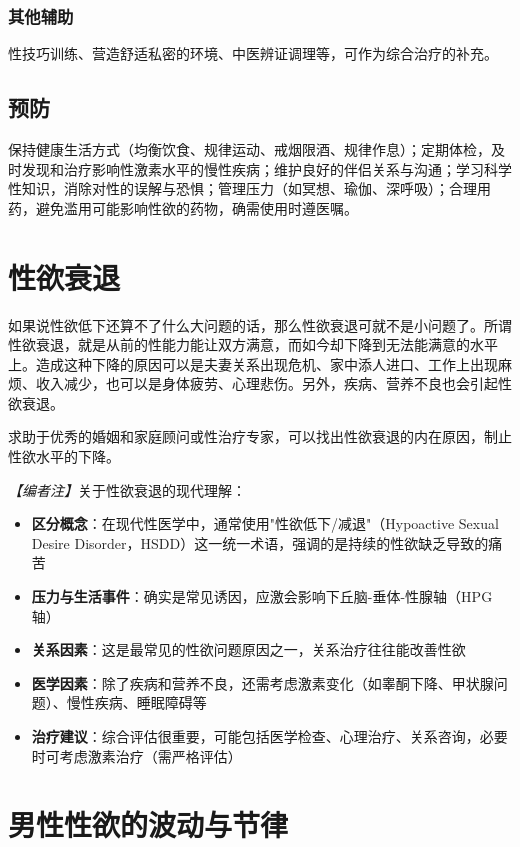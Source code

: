 \documentclass[12pt,a4paper,twoside]{ctexbook}
\begin{document}
\subsubsection{其他辅助}
性技巧训练、营造舒适私密的环境、中医辨证调理等，可作为综合治疗的补充。

\subsection{预防}
保持健康生活方式（均衡饮食、规律运动、戒烟限酒、规律作息）；定期体检，及时发现和治疗影响性激素水平的慢性疾病；维护良好的伴侣关系与沟通；学习科学性知识，消除对性的误解与恐惧；管理压力（如冥想、瑜伽、深呼吸）；合理用药，避免滥用可能影响性欲的药物，确需使用时遵医嘱。


\section{性欲衰退}

如果说性欲低下还算不了什么大问题的话，那么性欲衰退可就不是小问题了。所谓性欲衰退，就是从前的性能力能让双方满意，而如今却下降到无法能满意的水平上。造成这种下降的原因可以是夫妻关系出现危机、家中添人进口、工作上出现麻烦、收入减少，也可以是身体疲劳、心理悲伤。另外，疾病、营养不良也会引起性欲衰退。

求助于优秀的婚姻和家庭顾问或性治疗专家，可以找出性欲衰退的内在原因，制止性欲水平的下降。

\noindent\textit{【编者注】}关于性欲衰退的现代理解：
\begin{itemize}
	\item \textbf{区分概念}：在现代性医学中，通常使用"性欲低下/减退"（Hypoactive Sexual Desire Disorder，HSDD）这一统一术语，强调的是持续的性欲缺乏导致的痛苦
	\item \textbf{压力与生活事件}：确实是常见诱因，应激会影响下丘脑-垂体-性腺轴（HPG轴）
	\item \textbf{关系因素}：这是最常见的性欲问题原因之一，关系治疗往往能改善性欲
	\item \textbf{医学因素}：除了疾病和营养不良，还需考虑激素变化（如睾酮下降、甲状腺问题）、慢性疾病、睡眠障碍等
	\item \textbf{治疗建议}：综合评估很重要，可能包括医学检查、心理治疗、关系咨询，必要时可考虑激素治疗（需严格评估）
\end{itemize}


\section{男性性欲的波动与节律}
\end{document}
